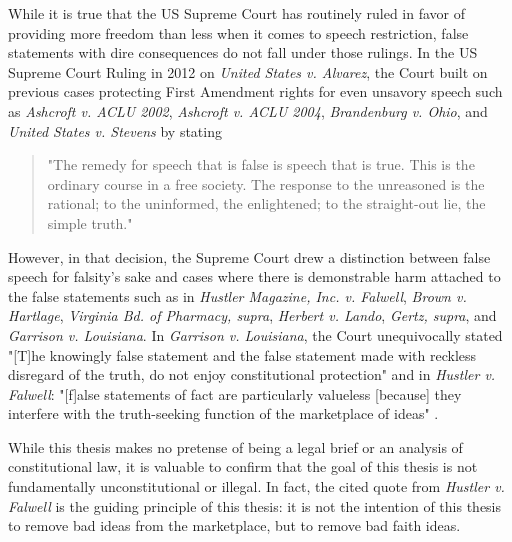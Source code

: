 \documentclass[preprint,review,12pt]{elsarticle}
\begin{document}
While it is true that the US Supreme Court has routinely ruled in favor of providing more freedom than less when it comes to speech restriction, false statements with dire consequences do not fall under those rulings. In the US Supreme Court Ruling in 2012 on \textit{United States v. Alvarez}, the Court built on previous cases protecting First Amendment rights for even unsavory speech such as  \textit{Ashcroft v. ACLU 2002}, \textit{Ashcroft v. ACLU 2004}, \textit{Brandenburg v. Ohio}, and \textit{United States v. Stevens} by stating 
\begin{quote}"The remedy for speech that is false is speech that is true. This is the ordinary course in a free society. The response to the unreasoned is the rational; to the uninformed, the enlightened; to the straight-out lie, the simple truth."\cite{scotus2012alvarez}\end{quote} 
However, in that decision, the Supreme Court drew a distinction between false speech for falsity's sake and cases where there is demonstrable harm attached to the false statements such as in \textit{Hustler Magazine, Inc. v. Falwell}, \textit{Brown v. Hartlage}, \textit{Virginia Bd. of Pharmacy, supra}, \textit{Herbert v. Lando}, \textit{Gertz, supra}, and \textit{Garrison v. Louisiana}. In \textit{Garrison v. Louisiana}, the Court unequivocally stated "[T]he knowingly false statement and the false statement made with reckless disregard of the truth, do not enjoy constitutional protection" \cite{scotus1964garrison} and in \textit{Hustler v. Falwell}: "[f]alse statements of fact are particularly valueless [because] they interfere with the truth-seeking function of the marketplace of ideas" \cite{scotus1987hustler}. 

While this thesis makes no pretense of being a legal brief or an analysis of constitutional law, it is valuable to confirm that the goal of this thesis is not fundamentally unconstitutional or illegal. In fact, the cited quote from \textit{Hustler v. Falwell} is the guiding principle of this thesis: it is not the intention of this thesis to remove bad ideas from the marketplace, but to remove bad faith ideas.
\end{document}
